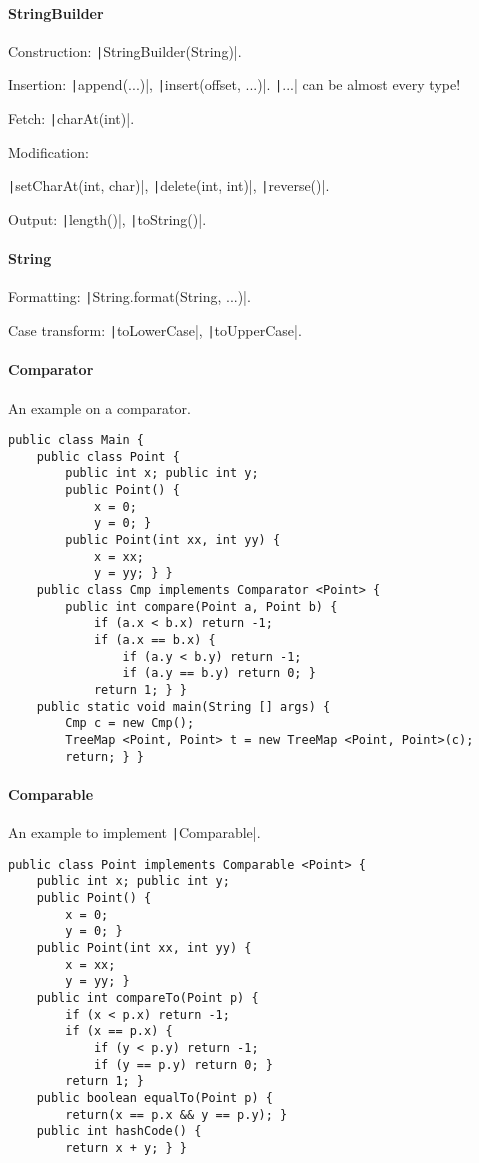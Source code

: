 \paragraph{StringBuilder}

Construction: \texttt|StringBuilder(String)|.

Insertion: \texttt|append(...)|, \texttt|insert(offset, ...)|. \texttt|...| can be almost every type!

Fetch: \texttt|charAt(int)|.

Modification:

\texttt|setCharAt(int, char)|, \texttt|delete(int, int)|, \texttt|reverse()|.

Output: \texttt|length()|, \texttt|toString()|.

\paragraph{String}
Formatting: \texttt|String.format(String, ...)|.

Case transform: \texttt|toLowerCase|, \texttt|toUpperCase|.

\paragraph{Comparator}
An example on a comparator.

\begin{verbatim}
public class Main {
	public class Point {
		public int x; public int y;
		public Point() {
			x = 0;
			y = 0; }
		public Point(int xx, int yy) {
			x = xx;
			y = yy; } }
	public class Cmp implements Comparator <Point> {
		public int compare(Point a, Point b) {
			if (a.x < b.x) return -1;
			if (a.x == b.x) {
				if (a.y < b.y) return -1;
				if (a.y == b.y) return 0; }
			return 1; } }
	public static void main(String [] args) {
		Cmp c = new Cmp();
		TreeMap <Point, Point> t = new TreeMap <Point, Point>(c);
		return; } }
\end{verbatim}

\paragraph{Comparable}
An example to implement \texttt|Comparable|.

\begin{verbatim}
public class Point implements Comparable <Point> {
	public int x; public int y;
	public Point() {
		x = 0;
		y = 0; }
	public Point(int xx, int yy) {
		x = xx;
		y = yy; }
	public int compareTo(Point p) {
		if (x < p.x) return -1;
		if (x == p.x) {
			if (y < p.y) return -1;
			if (y == p.y) return 0; }
		return 1; }
	public boolean equalTo(Point p) {
		return(x == p.x && y == p.y); }
	public int hashCode() {
		return x + y; } }
\end{verbatim}

